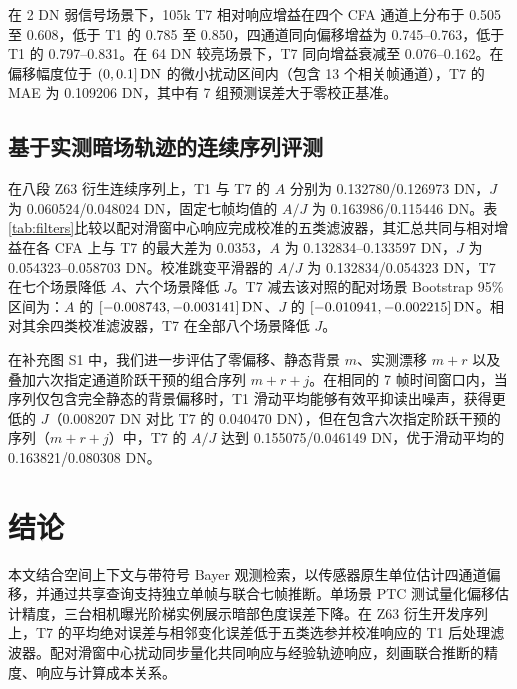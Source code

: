 在 2 DN 弱信号场景下，105k T7 相对响应增益在四个 CFA 通道上分布于 0.505 至 0.608，低于 T1 的 0.785 至 0.850，四通道同向偏移增益为 0.745--0.763，低于 T1 的 0.797--0.831。在 64 DN 较亮场景下，T7 同向增益衰减至 0.076--0.162。在偏移幅度位于 $(0,0.1]\,\mathrm{DN}$ 的微小扰动区间内（包含 13 个相关帧通道），T7 的 MAE 为 0.109206 DN，其中有 7 组预测误差大于零校正基准。


\subsection{基于实测暗场轨迹的连续序列评测}
在八段 Z63 衍生连续序列上，T1 与 T7 的 $A$ 分别为 0.132780/0.126973 DN，$J$ 为 0.060524/0.048024 DN，固定七帧均值的 $A/J$ 为 0.163986/0.115446 DN。表\ref{tab:filters}比较以配对滑窗中心响应完成校准的五类滤波器，其汇总共同与相对增益在各 CFA 上与 T7 的最大差为 0.0353，$A$ 为 0.132834--0.133597 DN，$J$ 为 0.054323--0.058703 DN。校准跳变平滑器的 $A/J$ 为 0.132834/0.054323 DN，T7 在七个场景降低 $A$、六个场景降低 $J$。T7 减去该对照的配对场景 Bootstrap 95\% 区间为：$A$ 的 $[-0.008743,-0.003141]\,\mathrm{DN}$、$J$ 的 $[-0.010941,-0.002215]\,\mathrm{DN}$。相对其余四类校准滤波器，T7 在全部八个场景降低 $J$。


在补充图 S1 中，我们进一步评估了零偏移、静态背景 $m$、实测漂移 $m+r$ 以及叠加六次指定通道阶跃干预的组合序列 $m+r+j$。在相同的 7 帧时间窗口内，当序列仅包含完全静态的背景偏移时，T1 滑动平均能够有效平抑读出噪声，获得更低的 $J$（0.008207 DN 对比 T7 的 0.040470 DN），但在包含六次指定阶跃干预的序列（$m+r+j$）中，T7 的 $A/J$ 达到 0.155075/0.046149 DN，优于滑动平均的 0.163821/0.080308 DN。

\section{结论}
本文结合空间上下文与带符号 Bayer 观测检索，以传感器原生单位估计四通道偏移，并通过共享查询支持独立单帧与联合七帧推断。单场景 PTC 测试量化偏移估计精度，三台相机曝光阶梯实例展示暗部色度误差下降。在 Z63 衍生开发序列上，T7 的平均绝对误差与相邻变化误差低于五类选参并校准响应的 T1 后处理滤波器。配对滑窗中心扰动同步量化共同响应与经验轨迹响应，刻画联合推断的精度、响应与计算成本关系。

\balance



